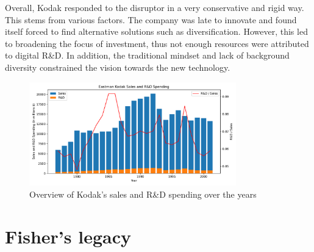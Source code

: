 \documentclass[a4paper,10pt,UTF8]{scrartcl}
\begin{document}
Overall, Kodak responded to the disruptor in a very conservative and rigid way. This stems from various factors. The company was late to innovate and found itself forced to find alternative solutions such as diversification. However, this led to broadening the focus of investment, thus not enough resources were attributed to digital R\&D. In addition, the traditional mindset and lack of background diversity constrained the vision towards the new technology. 


\begin{figure}[htbp]
    \centering
    \includegraphics[width=0.8\textwidth]{Sales_and_RD.pdf}
    \caption{Overview of Kodak's sales and R\&D spending over the years}
    \label{fig:1}
\end{figure}



\section{Fisher's legacy}
\end{document}
